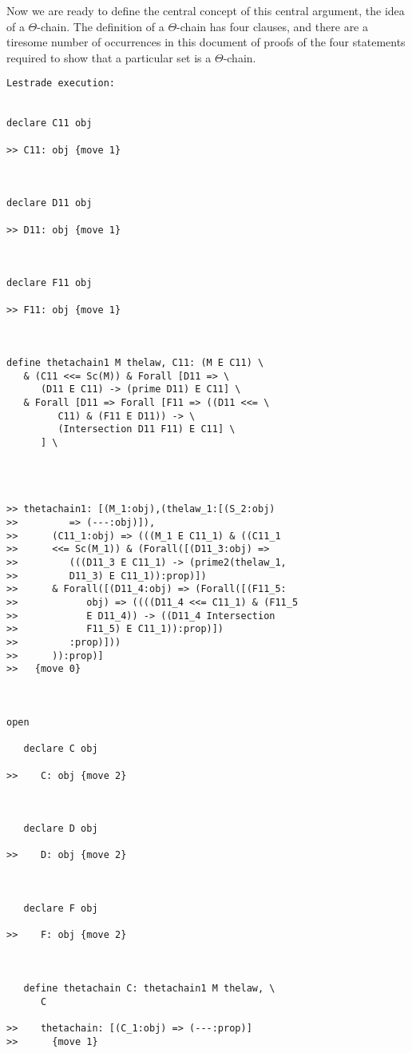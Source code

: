 \documentclass[12pt]{article}
\begin{document}
Now we are ready to define the central concept of this central argument, the idea of a $\Theta$-chain.  The definition of a $\Theta$-chain has four clauses, and there are a tiresome number of occurrences in this document of proofs of the four statements required to show that a particular set is a $\Theta$-chain.

\begin{verbatim}Lestrade execution:


declare C11 obj

>> C11: obj {move 1}



declare D11 obj

>> D11: obj {move 1}



declare F11 obj

>> F11: obj {move 1}



define thetachain1 M thelaw, C11: (M E C11) \
   & (C11 <<= Sc(M)) & Forall [D11 => \
      (D11 E C11) -> (prime D11) E C11] \
   & Forall [D11 => Forall [F11 => ((D11 <<= \
         C11) & (F11 E D11)) -> \
         (Intersection D11 F11) E C11] \
      ] \
   



>> thetachain1: [(M_1:obj),(thelaw_1:[(S_2:obj)
>>         => (---:obj)]),
>>      (C11_1:obj) => (((M_1 E C11_1) & ((C11_1
>>      <<= Sc(M_1)) & (Forall([(D11_3:obj) =>
>>         (((D11_3 E C11_1) -> (prime2(thelaw_1,
>>         D11_3) E C11_1)):prop)])
>>      & Forall([(D11_4:obj) => (Forall([(F11_5:
>>            obj) => ((((D11_4 <<= C11_1) & (F11_5
>>            E D11_4)) -> ((D11_4 Intersection
>>            F11_5) E C11_1)):prop)])
>>         :prop)]))
>>      )):prop)]
>>   {move 0}



open

   declare C obj

>>    C: obj {move 2}



   declare D obj

>>    D: obj {move 2}



   declare F obj

>>    F: obj {move 2}



   define thetachain C: thetachain1 M thelaw, \
      C

>>    thetachain: [(C_1:obj) => (---:prop)]
>>      {move 1}




\end{verbatim}
\end{document}

